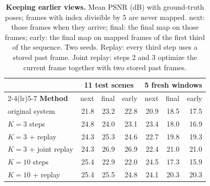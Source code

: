 \begin{table}[t]
\centering
\footnotesize\setlength{\tabcolsep}{3pt}
\begin{tabular}{lrrrrrr}
\toprule
& \multicolumn{3}{c}{11 test scenes} & \multicolumn{3}{c}{5 fresh windows} \\
\cmidrule(lr){2-4}\cmidrule(lr){5-7}
\textbf{Method} & next & final & early & next & final & early \\
\midrule
original system & 21.8 & 23.2 & 22.8 & 20.9 & 18.5 & 17.5 \\
\midrule
$K{=}3$ steps & 24.8 & 24.0 & 23.1 & 23.4 & 18.0 & 16.9 \\
$K{=}3$ + replay & 24.3 & 25.3 & 24.6 & 22.7 & 19.8 & 19.3 \\
\midrule
$K{=}3$ + joint replay & 24.3 & 26.9 & 26.9 & 22.4 & 21.0 & 21.0 \\
$K{=}10$ steps & 25.4 & 22.9 & 22.0 & 24.5 & 17.3 & 15.9 \\
$K{=}10$ + replay & 25.4 & 25.5 & 24.8 & 24.1 & 20.3 & 20.3 \\
\bottomrule
\end{tabular}
\caption{\textbf{Keeping earlier views.} Mean PSNR (dB) with ground-truth poses; frames with index divisible by 5 are never mapped. next: those frames when they arrive; final: the final map on those frames; early: the final map on mapped frames of the first third of the sequence. Two seeds. Replay: every third step uses a stored past frame. Joint replay: steps 2 and 3 optimize the current frame together with two stored past frames.}
\label{tab:keep}
\end{table}
